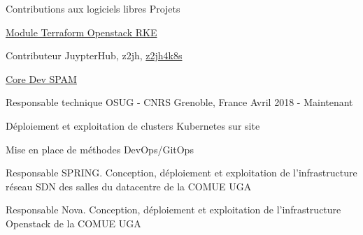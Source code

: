 

\begin{cventries}

  \cventry
    {Contributions aux logiciels libres} %
    {Projets}
    {}
    {}
    {
      \begin{cvitems} %
        \item {\href{https://github.com/remche/terraform-openstack-rke}{Module Terraform Openstack RKE \faGithub}}
        \item {Contributeur JuypterHub, z2jh, \href{https://github.com/remche/z2jh4k8s}{z2jh4k8s \faGithub}}
        \item {\href{https://ttk.gricad-pages.univ-grenoble-alpes.fr/spam/intro.html}{Core Dev SPAM \faGlobe}}
      \end{cvitems}
    }

  \cventry
    {Responsable technique} %
    {OSUG - CNRS} %
    {Grenoble, France} %
    {Avril 2018 - Maintenant} %
    {
      \begin{cvitems} %
        \item {Déploiement et exploitation de clusters Kubernetes sur site}
        \item {Mise en place de méthodes DevOps/GitOps}
        \item {Responsable SPRING. Conception, déploiement et exploitation de l'infrastructure réseau SDN des salles du datacentre de la COMUE UGA}
        \item {Responsable Nova. Conception, déploiement et exploitation de l'infrastructure Openstack de la COMUE UGA}
      \end{cvitems}
    }


\end{cventries}
